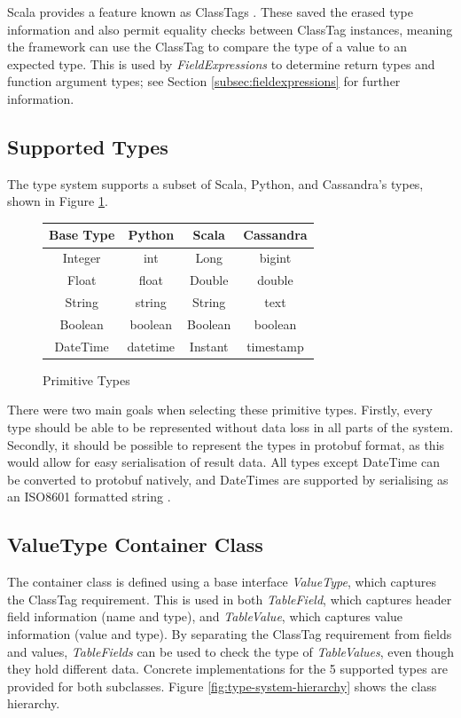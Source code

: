 Scala provides a feature known as ClassTags \cite{scalaclasstags}. These saved the erased type information and also permit equality checks between ClassTag instances, meaning the framework can use the ClassTag to compare the type of a value to an expected type. This is used by \textit{FieldExpressions} to determine return types and function argument types; see Section \ref{subsec:fieldexpressions} for further information.

\subsection{Supported Types}
The type system supports a subset of Scala, Python, and Cassandra's types, shown in Figure \ref{fig:datatypes}.

\begin{figure}[h]
	\centering
	\begin{tabular}{| c | c | c | c |}
		\hline
		\textbf{Base Type} & \textbf{Python} & \textbf{Scala} & \textbf{Cassandra} \\ \hline
		Integer & int & Long & bigint \\ \hline
		Float & float & Double & double \\ \hline
		String & string & String & text \\ \hline
		Boolean & boolean & Boolean & boolean \\ \hline
		DateTime & datetime & Instant & timestamp \\ \hline
	\end{tabular}
	\caption{Primitive Types}
	\label{fig:datatypes}
\end{figure}

There were two main goals when selecting these primitive types. Firstly, every type should be able to be represented without data loss in all parts of the system. Secondly, it should be possible to represent the types in protobuf format, as this would allow for easy serialisation of result data. All types except DateTime can be converted to protobuf natively, and DateTimes are supported by serialising as an ISO8601 formatted string \cite{iso_8601}.

\subsection{ValueType Container Class}
The container class is defined using a base interface \textit{ValueType}, which captures the ClassTag requirement. This is used in both \textit{TableField}, which captures header field information (name and type), and \textit{TableValue}, which captures value information (value and type). By separating the ClassTag requirement from fields and values, \textit{TableFields} can be used to check the type of \textit{TableValues}, even though they hold different data. Concrete implementations for the 5 supported types are provided for both subclasses. Figure \ref{fig:type-system-hierarchy} shows the class hierarchy.

